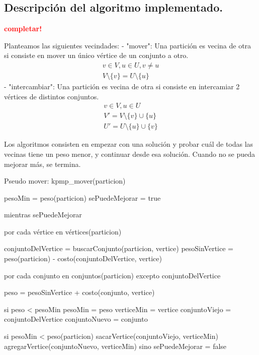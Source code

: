 \subsection{Descripción del algoritmo implementado.}
\vspace*{0.3cm}
\textcolor{red}{\textbf{completar!}}

Planteamos las siguientes vecindades:
- "mover": Una partición es vecina de otra si consiste en mover un único vértice de un conjunto a otro.
\begin{align*}
  v \in V, u \in U, v \ne u \\
  V \setminus \{v\} = U \setminus \{u\}
\end{align*}
- "intercambiar": Una partición es vecina de otra si consiste en intercamiar 2 vértices de distintos conjuntos.
\begin{align*}
  v \in V, u \in U \\
  V' = V \setminus \{v\} \cup \{u\} \\
  U' = U \setminus \{u\} \cup \{v\}
\end{align*}

Los algoritmos consisten en empezar con una solución y probar cuál de todas las vecinas tiene un peso menor, y continuar desde esa solución. Cuando no se pueda mejorar más, se termina.

Pseudo mover:
kpmp\_mover(particion) {
	pesoMin = peso(particion)
	sePuedeMejorar = true

	mientras sePuedeMejorar {
		por cada vértice en vértices(particion) {
			conjuntoDelVertice = buscarConjunto(particion, vertice)
			pesoSinVertice = peso(particion) - costo(conjuntoDelVertice, vertice)

			por cada conjunto en conjuntos(particion) excepto conjuntoDelVertice {
				peso = pesoSinVertice + costo(conjunto, vertice)

				si peso < pesoMin {
					pesoMin = peso
					verticeMin = vertice
					conjuntoViejo = conjuntoDelVertice
					conjuntoNuevo = conjunto
				}
			}
		}

		si pesoMin < peso(particion) {
			sacarVertice(conjuntoViejo, verticeMin)
			agregarVertice(conjuntoNuevo, verticeMin)
		} sino {
			sePuedeMejorar = false
		}
	}
}

